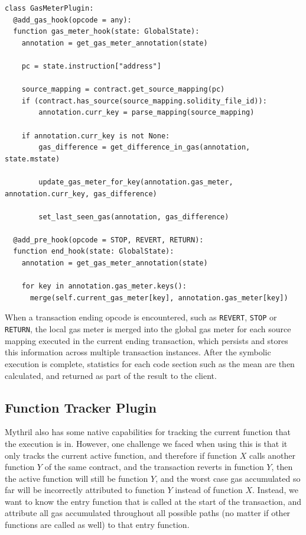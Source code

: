 \begin{lstlisting}[language=Pseudocode, caption={Hooks implemented for gas meter plugin}, label={lst:gas_meter_hooks}, basicstyle=\ttfamily\scriptsize]
class GasMeterPlugin:
  @add_gas_hook(opcode = any):
  function gas_meter_hook(state: GlobalState):
    annotation = get_gas_meter_annotation(state)
                
    pc = state.instruction["address"]
    
    source_mapping = contract.get_source_mapping(pc)
    if (contract.has_source(source_mapping.solidity_file_id)):
        annotation.curr_key = parse_mapping(source_mapping)
    
    if annotation.curr_key is not None:
        gas_difference = get_difference_in_gas(annotation, state.mstate)
        
        update_gas_meter_for_key(annotation.gas_meter, annotation.curr_key, gas_difference)

        set_last_seen_gas(annotation, gas_difference)

  @add_pre_hook(opcode = STOP, REVERT, RETURN):
  function end_hook(state: GlobalState):
    annotation = get_gas_meter_annotation(state)
                
    for key in annotation.gas_meter.keys():
      merge(self.current_gas_meter[key], annotation.gas_meter[key])
\end{lstlisting}

When a transaction ending opcode is encountered, such as \texttt{REVERT}, \texttt{STOP} or \texttt{RETURN},
the local gas meter is merged into the global gas meter for each source mapping executed in the 
current ending transaction, which persists and stores this information across multiple transaction 
instances. After the symbolic execution is complete, statistics for each code section such as the mean are 
then calculated, and returned as part of the result to the client.


\subsection{Function Tracker Plugin}

Mythril also has some native capabilities for tracking the current function that the execution is in.
However, one challenge we faced when using this is that 
it only tracks the current active function, and therefore if function $X$ calls another
function $Y$ of the same contract, and the transaction reverts in function $Y$, then the active function
will still be function $Y$, and the worst case gas accumulated so far will be incorrectly attributed
to function $Y$ instead of function $X$. Instead, we want to know the entry function that is called
at the start of the transaction, and attribute all gas accumulated throughout all possible paths (no matter
if other functions are called as well) to that entry function.

